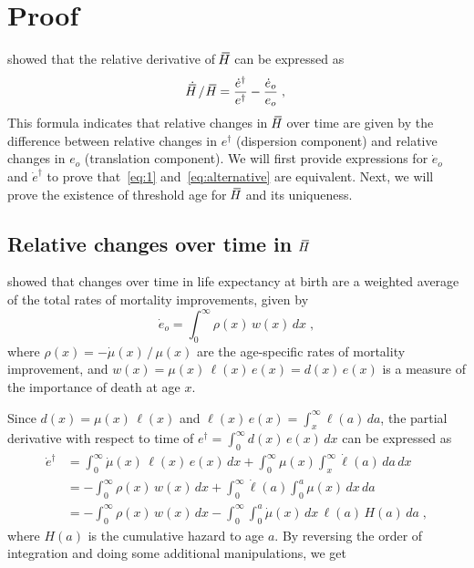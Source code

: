 \documentclass[a4paper,twoside, openright, 12pt, leqno]{article}
\newcommand*\xbar[1]{%
   \hbox{%
     \vbox{%
       \hrule height 0.5pt %
       \kern0.3ex%
       \hbox{%
         \kern-0.28em%
         \ensuremath{#1}%
         \kern-0.05em%
       }%
     }%
   }%
}
\begin{document}
\section{Proof}

\cite{Fernandez2015} showed that the relative derivative of $\,\xbar{H}$ can be expressed as
%
\begin{equation}
\dot{\xbar{H}}\,/\,\,\xbar{H}=\frac{\dot{e}^\dagger}{e^\dagger}-\frac{\dot{e}_o}{e_o}\;,
\label{eq:alternative}
\end{equation}
%
This formula indicates that relative changes in $\,\xbar{H}$ over time are given by the difference between relative changes in $e^\dagger$ (dispersion component) and relative changes in $e_o$ (translation component). We will first provide expressions for $\dot{e}_o$ and $\dot{e}^\dagger$ to prove that~\eqref{eq:1} and~\eqref{eq:alternative} are equivalent. Next, we will prove the existence of threshold age for $\,\xbar{H}$ and its uniqueness.

 
\subsection{Relative changes over time in $\,\xbar{H}$}

\cite{Vaupel2003} showed that changes over time in life expectancy at birth are a weighted average of the total rates of mortality improvements, given by
%
\begin{equation}
\label{ex.derivative}
\dot{e}_o=\int_0^\infty\rho(x)\,w(x)\,dx\;,
\end{equation}
where $\rho(x)=-\dot{\mu}(x)\,/\,\mu(x)$ are the age-specific rates of mortality improvement, and $w(x)=\mu(x)\,\ell(x)\,e(x) = d(x)\,e(x)$ is a measure of the importance of death at age $x$. 

Since $d(x)=\mu(x)\,\ell(x)$ and $\ell(x)\,e(x)=\int_x^\infty\ell(a)\,da$, the partial derivative with respect to time of $e^\dagger=\int_0^\infty d(x)\,e(x)\,dx$ can be expressed as
%
\begin{equation*}
 \begin{split}
 \dot{e}^\dagger	& = \int_0^\infty\dot{\mu}(x)\,\ell(x)\,e(x)\,dx+\int_0^\infty\mu(x)\int_x^\infty\dot{\ell}(a)\,da\,dx		\\
			& = -\int_0^\infty\rho(x)\,w(x)\,dx+\int_0^\infty\dot{\ell}(a)\int_0^a\mu(x)\,dx\,da                         \\
			& = -\int_0^\infty\rho(x)\,w(x)\,dx-\int_0^\infty\int_0^a\dot{\mu}(x)\,dx\,\ell(a)\,H(a)\,da\;,
 \end{split}
\end{equation*}
%
where $H(a)$ is the cumulative hazard to age $a$. By reversing the order of integration and doing some additional manipulations, we get
\end{document}
